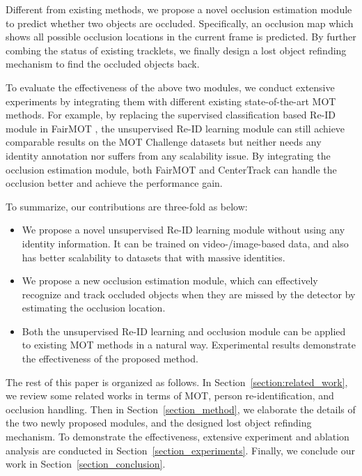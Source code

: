 \documentclass[final,1p,times,twocolumn]{elsarticle}
\newcommand{\Sref}[1]{Section~\ref{#1}}
\begin{document}
	Different from existing methods, we propose a novel occlusion estimation module to predict whether two objects are occluded. Specifically, an occlusion map which shows all possible occlusion locations in the current frame is predicted. By further combing the status of existing tracklets, we finally design a lost object refinding mechanism to find the occluded objects back.
	
	To evaluate the effectiveness of the above two modules, we conduct extensive experiments by integrating them with different existing state-of-the-art MOT methods. For example, by replacing the supervised classification based Re-ID module in FairMOT \cite{zhang2020fairmot}, the unsupervised Re-ID learning module can still achieve comparable results on the MOT Challenge datasets\cite{milan2016mot16, dendorfer2020mot20} but neither needs any identity annotation nor suffers from any scalability issue. By integrating the occlusion estimation module, both FairMOT \cite{zhang2020fairmot} and CenterTrack \cite{zhou2020tracking} can handle the occlusion better and achieve the performance gain.
	
	To summarize, our contributions are three-fold as below: 
	\begin{itemize}
		\item We propose a novel unsupervised Re-ID learning module without using any identity information. It can be trained on video-/image-based data, and also has better scalability to datasets that with massive identities. 
		\item We propose a new occlusion estimation module, which can effectively recognize and track occluded objects when they are missed by the detector by estimating the occlusion location.  \item Both the unsupervised Re-ID learning and occlusion module can be applied to existing MOT methods in a natural way. Experimental results demonstrate the effectiveness of the proposed method.
	\end{itemize}
	
	The rest of this paper is organized as follows. In \Sref{section:related_work}, we review some related works in terms of MOT, person re-identification, and occlusion handling. Then in \Sref{section_method}, we elaborate the details of the two newly proposed modules, and the designed lost object refinding mechanism. To demonstrate the effectiveness, extensive experiment and ablation analysis are conducted in \Sref{section_experiments}. Finally, we conclude our work in \Sref{section_conclusion}. 
	
\end{document}
